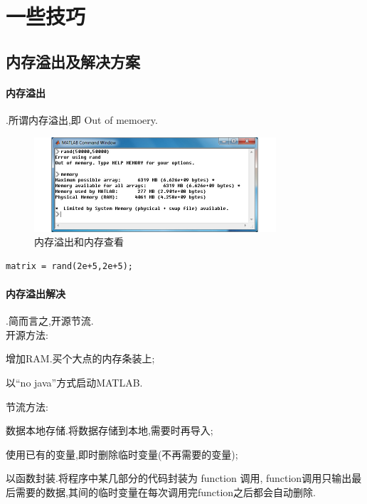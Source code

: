 \section{一些技巧}

\subsection{内存溢出及解决方案}
 
\paragraph{内存溢出}.所谓内存溢出,即  Out of memoery.

\begin{figure}[htbp]
\centering
\includegraphics[width=9cm]{diagrams/memoryout.jpg}
\caption{内存溢出和内存查看}
\end{figure}

\vspace{-1.0cm}
\begin{lstlisting}[caption = 生成随机矩阵]
  matrix = rand(2e+5,2e+5);
\end{lstlisting}



\paragraph{内存溢出解决}.简而言之,开源节流.\\
开源方法:
\begin{itemize*}
	\item 增加RAM.买个大点的内存条装上;
	\item 以“no java”方式启动MATLAB.
\end{itemize*}
节流方法:
\begin{itemize*}
	\item 数据本地存储.将数据存储到本地,需要时再导入;
	\item 使用已有的变量,即时删除临时变量(不再需要的变量);
	\item 以函数封装.将程序中某几部分的代码封装为 function 调用, function调用只输出最后需要的数据,其间的临时变量在每次调用完function之后都会自动删除.
\end{itemize*}



